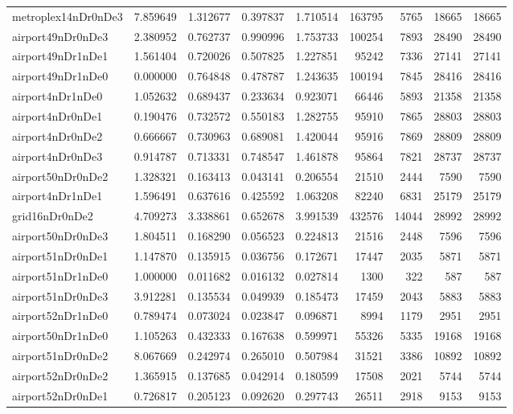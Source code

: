 \begin{longtable}{|l|r|r|r|r|r|r|r|r|}
metroplex14nDr0nDe3 & 7.859649 & 1.312677 & 0.397837 & 1.710514 & 163795 & 5765 & 18665 & 18665 \\
airport49nDr0nDe3 & 2.380952 & 0.762737 & 0.990996 & 1.753733 & 100254 & 7893 & 28490 & 28490 \\
airport49nDr1nDe1 & 1.561404 & 0.720026 & 0.507825 & 1.227851 & 95242 & 7336 & 27141 & 27141 \\
airport49nDr1nDe0 & 0.000000 & 0.764848 & 0.478787 & 1.243635 & 100194 & 7845 & 28416 & 28416 \\
airport4nDr1nDe0 & 1.052632 & 0.689437 & 0.233634 & 0.923071 & 66446 & 5893 & 21358 & 21358 \\
airport4nDr0nDe1 & 0.190476 & 0.732572 & 0.550183 & 1.282755 & 95910 & 7865 & 28803 & 28803 \\
airport4nDr0nDe2 & 0.666667 & 0.730963 & 0.689081 & 1.420044 & 95916 & 7869 & 28809 & 28809 \\
airport4nDr0nDe3 & 0.914787 & 0.713331 & 0.748547 & 1.461878 & 95864 & 7821 & 28737 & 28737 \\
airport50nDr0nDe2 & 1.328321 & 0.163413 & 0.043141 & 0.206554 & 21510 & 2444 & 7590 & 7590 \\
airport4nDr1nDe1 & 1.596491 & 0.637616 & 0.425592 & 1.063208 & 82240 & 6831 & 25179 & 25179 \\
grid16nDr0nDe2 & 4.709273 & 3.338861 & 0.652678 & 3.991539 & 432576 & 14044 & 28992 & 28992 \\
airport50nDr0nDe3 & 1.804511 & 0.168290 & 0.056523 & 0.224813 & 21516 & 2448 & 7596 & 7596 \\
airport51nDr0nDe1 & 1.147870 & 0.135915 & 0.036756 & 0.172671 & 17447 & 2035 & 5871 & 5871 \\
airport51nDr1nDe0 & 1.000000 & 0.011682 & 0.016132 & 0.027814 & 1300 & 322 & 587 & 587 \\
airport51nDr0nDe3 & 3.912281 & 0.135534 & 0.049939 & 0.185473 & 17459 & 2043 & 5883 & 5883 \\
airport52nDr1nDe0 & 0.789474 & 0.073024 & 0.023847 & 0.096871 & 8994 & 1179 & 2951 & 2951 \\
airport50nDr1nDe0 & 1.105263 & 0.432333 & 0.167638 & 0.599971 & 55326 & 5335 & 19168 & 19168 \\
airport51nDr0nDe2 & 8.067669 & 0.242974 & 0.265010 & 0.507984 & 31521 & 3386 & 10892 & 10892 \\
airport52nDr0nDe2 & 1.365915 & 0.137685 & 0.042914 & 0.180599 & 17508 & 2021 & 5744 & 5744 \\
airport52nDr0nDe1 & 0.726817 & 0.205123 & 0.092620 & 0.297743 & 26511 & 2918 & 9153 & 9153 \\

\end{longtable}
